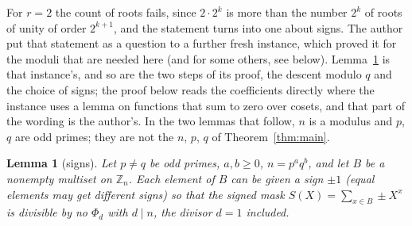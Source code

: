 \documentclass[11pt,a4paper]{amsart}
\newtheorem{lemma}[theorem]{Lemma}
\theoremstyle{definition}
\theoremstyle{remark}
\newcommand{\Z}{\mathbb{Z}}
\begin{document}
For $r=2$ the count of roots fails, since $2\cdot2^k$ is more than the number $2^k$ of roots of unity of order $2^{k+1}$, and the
statement turns into one about signs. The author put that statement as a question to a further fresh instance, which
proved it for the moduli that are needed here (and for some others, see below). Lemma~\ref{lem:signs} is that
instance's, and so are the two steps of its proof, the descent modulo $q$ and the choice of signs; the proof below
reads the coefficients directly where the instance uses a lemma on functions that sum to zero over cosets, and that
part of the wording is the author's. In the two lemmas that follow, $n$ is a modulus and $p$, $q$ are odd primes; they
are not the $n$, $p$, $q$ of Theorem~\ref{thm:main}.

\begin{lemma}[signs]\label{lem:signs}
Let $p\ne q$ be odd primes, $a,b\ge0$, $n=p^aq^b$, and let $B$ be a nonempty multiset on $\Z_n$. Each element of $B$
can be given a sign $\pm1$ (equal elements may get different signs) so that the signed mask
$S(X)=\sum_{x\in B}\pm X^x$ is divisible by no $\Phi_d$ with $d\mid n$, the divisor $d=1$ included.
\end{lemma}
\end{document}
